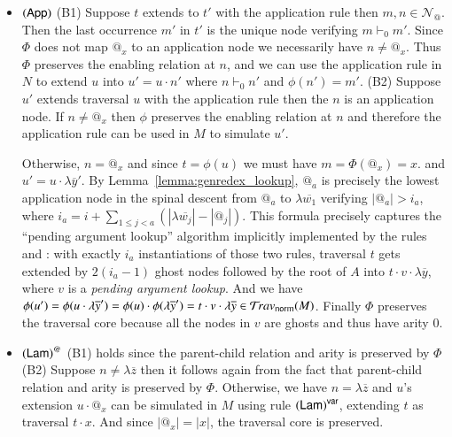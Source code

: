 \documentclass{elsarticle}
\makeatletter
\newif\iflongversion
\theoremstyle{plain}
\theoremstyle{definition}
\newcommand\Nodes{\mathcal{N}}%
\newcommand\NodesApp{\Nodes_@}%
\newcommand{\normalizing}{{\sf norm}}
\newcommand{\travsetnorm}{\travset_\normalizing} %
\newcommand{\enables}{\vdash} %
\makeatother
\begin{document}
\iflongversion
\begin{itemize}[itemindent=0.1em, leftmargin=0.4em]
    \item $\mathbf{({\sf App})}$
    (B1) Suppose $t$ extends to $t'$ with the application rule then $m, n \in\NodesApp$. Then the last occurrence $m'$ in $t'$ is the unique node verifying $m \enables_0 m'$.  Since $\Phi$ does not map $@_x$ to an application node we necessarily have  $n \neq @_x$. Thus $\Phi$ preserves the enabling relation at $n$, and we can use the application rule in $N$ to extend $u$ into $u' = u \cdot n'$ where $n \enables_0 n'$ and $\phi(n') = m'$.
    (B2) Suppose $u'$ extends traversal $u$ with the application rule then the $n$ is an application node.
    If $n\neq@_x$ then $\phi$ preserves the enabling relation at $n$ and therefore the application rule can be used in $M$ to simulate $u'$.

    Otherwise, $n=@_x$ and since $t = \phi(u)$ we must have $m = \Phi(@_x) = x$.
    and $u' = u \cdot \lambda\overline{y}'$.
%
    By Lemma~\ref{lemma:genredex_lookup}, $@_a$ is precisely the lowest application node in the spinal descent
    from $@_a$ to $\lambda\overline{w_1}$ verifying $|@_a| >  i_a$,
        where $i_a = i + \sum_{1\leq j< a} (|\lambda\overline{w_j}| - |@_j|)$.
    This formula precisely captures the ``pending argument lookup'' algorithm implicitly
    implemented by the rules  and :
    with exactly $i_a$ instantiations of those two rules, traversal $t$ gets extended by $2(i_a-1)$ ghost nodes followed
    by the root of $A$ into $t \cdot v \cdot \lambda\overline{y}$,
    where  $v$ is a \emph{pending argument lookup}.
    And we have $\phi(u')
    = \phi(u \cdot \lambda\overline{y}')
    = \phi(u) \cdot \phi(\lambda\overline{y}')
    = t \cdot v \cdot \lambda\overline{y} \in \travsetnorm(M)$.
    Finally $\Phi$ preserves the traversal core because all the nodes in $v$ are ghosts and thus have arity $0$.

    \item $\mathbf{({\sf Lam})}^@$
    (B1) holds since the parent-child relation and arity is preserved by $\Phi$
    (B2) Suppose $n \neq \lambda\overline{z}$ then it follows again from the fact that parent-child relation and arity is preserved by $\Phi$.
    Otherwise, we have $n = \lambda\overline{z}$ and $u$'s extension $u \cdot @_x$ can be simulated in $M$ using rule $\mathbf{({\sf Lam})}^{\sf var}$, extending $t$ as traversal $t \cdot x$.
    And since $|@_x| = |x|$, the traversal core is preserved.


\end{itemize}
\end{document}
